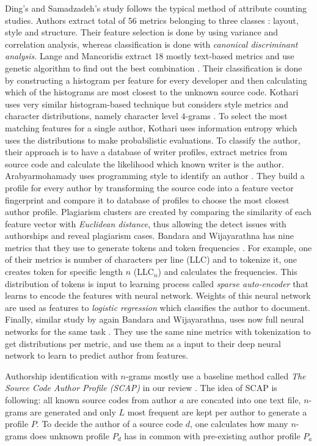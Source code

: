 Ding's and Samadzadeh's study follows the typical method of attribute counting studies. Authors extract total of 56 metrics belonging to three classes \cite{EJPFSAI2004}: layout, style and structure. Their feature selection is done by using variance and correlation analysis, whereas classification is done with \emph{canonical discriminant analysis}. Lange and Mancoridis extract 18 mostly text-based metrics and use genetic algorithm to find out the best combination \cite{UCMHGAAI2007}. Their classification is done by constructing a histogram per feature for every developer and then calculating which of the histograms are most closest to the unknown source code. Kothari \etal uses very similar histogram-based technique but considers style metrics and character distributions, namely character level $4$-grams \cite{APASCAI2007}. To select the most matching features for a single author, Kothari \etal uses information entropy which uses the distributions to make probabilistic evaluations. To classify the author, their approach is to have a database of writer profiles, extract metrics from source code and calculate the likelihood which known writer is the author. Arabyarmohamady \etal uses programming style to identify an author \cite{ACSBPD2012}. They build a profile for every author by transforming the source code into a feature vector \ie fingerprint and compare it to database of profiles to choose the most closest author profile. Plagiarism clusters are created by comparing the similarity of each feature vector with \emph{Euclidean distance}, thus allowing the detect issues with authorships and reveal plagiarism cases. Bandara and Wijayarathna has nine metrics that they use to generate tokens and token frequencies \cite{SCAIUFL2013}. For example, one of their metrics is number of characters per line (LLC) and to tokenize it, one creates token for specific length $n$ (LLC$_n$) and calculates the frequencies. This distribution of tokens is input to learning process called \emph{sparse auto-encoder} that learns to encode the features with neural network. Weights of this neural network are used as features to \emph{logistic regression} which classifies the author to document. Finally, similar study by again Bandara and Wijayarathna, uses now full neural networks for the same task \cite{DNNSCAI2013}. They use the same nine metrics with tokenization to get distributions per metric, and use them as a input to their deep neural network to learn to predict author from features.

Authorship identification with $n$-grams mostly use a baseline method called \emph{The Source Code Author Profile (SCAP)} in our review \cite{ESHPFSCAC2008, TSUDIJSCAI2011, CAPSCAP2014, ABEC2014}. The idea of SCAP is following: all known source codes from author $a$ are concated into one text file, $n$-grams are generated and only $L$ most frequent are kept per author to generate a profile $P$. To decide the author of a source code $d$, one calculates how many $n$-grams does unknown profile $P_d$ has in common with pre-existing author profile $P_a$

